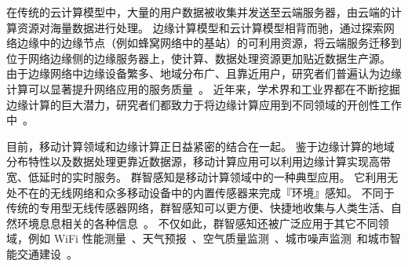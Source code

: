 
在传统的云计算模型中，大量的用户数据被收集并发送至云端服务器，由云端的计算资源对海量数据进行处理。
边缘计算模型和云计算模型相背而驰，通过探索网络边缘中的边缘节点（例如蜂窝网络中的基站）的可利用资源，将云端服务迁移到位于网络边缘侧的边缘服务器上，使计算、数据处理资源更加贴近数据生产源。
由于边缘网络中边缘设备繁多、地域分布广、且靠近用户，研究者们普遍认为边缘计算可以显著提升网络应用的服务质量~\cite{DBLP:conf/sigcomm/BonomiMZA12}。
近年来，学术界和工业界都在不断挖掘边缘计算的巨大潜力，研究者们都致力于将边缘计算应用到不同领域的开创性工作中~\cite{DBLP:journals/access/MarjanovicAZ18,DBLP:journals/iotj/ChiangZ16}。


目前，移动计算领域和边缘计算正日益紧密的结合在一起。
鉴于边缘计算的地域分布特性以及数据处理更靠近数据源，移动计算应用可以利用边缘计算实现高带宽、低延时的实时服务。
群智感知是移动计算领域中的一种典型应用。
它利用无处不在的无线网络和众多移动设备中的内置传感器来完成『环境』感知。
不同于传统的专用型无线传感器网络，群智感知可以更方便、快捷地收集与人类生活、自然环境息息相关的各种信息~\cite{DBLP:journals/cm/GuoCZYC16}。
不仅如此，群智感知还被广泛应用于其它不同领域，例如 WiFi 性能测量~\cite{DBLP:journals/cm/RosenLLCMB14}、天气预报~\cite{DBLP:journals/tpds/ZhaoMTL15}、空气质量监测~\cite{DBLP:conf/huc/ZhangXWC14}、城市噪声监测~\cite{DBLP:conf/huc/ZhengLWZLC14}和城市智能交通建设~\cite{DBLP:conf/icdcs/ZhouJL15}。



